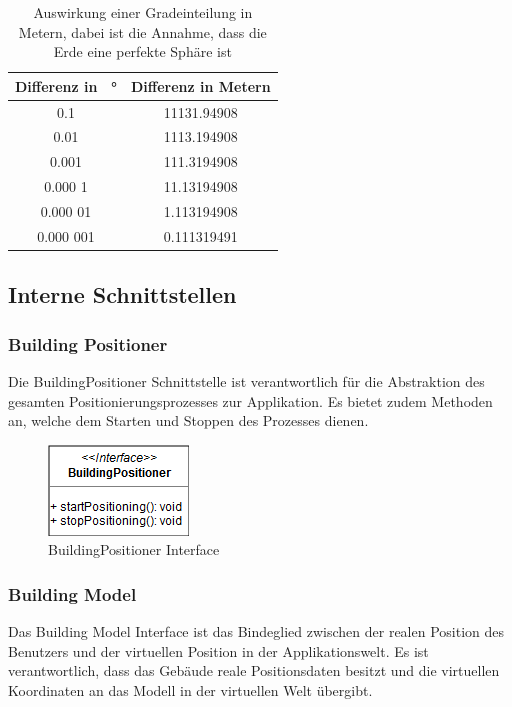 \documentclass[a4paper]{scrreprt}
\begin{document}
\begin{table}[htb]
	\centering
	\begin{tabular}{|c|c|}
		\hline
		\textbf{Differenz in \SI{}{\degree}} & \textbf{Differenz in Metern}\\
		\hline
		0.1 & 11131.94908 \\
		\hline
		0.01 & 1113.194908 \\
		\hline
		0.001 & 111.3194908 \\
		\hline
		0.000 1 & 11.13194908 \\
		\hline
		0.000 01 & 1.113194908 \\
		\hline
		0.000 001 & 0.111319491 \\
		\hline
	\end{tabular} 
	\caption{Auswirkung einer Gradeinteilung in Metern, dabei ist die Annahme, dass die Erde eine perfekte Sphäre ist}
	\label{tab:GradMeter}
\end{table}

\subsection{Interne Schnittstellen}

\subsubsection{Building Positioner}
Die BuildingPositioner Schnittstelle ist verantwortlich für die Abstraktion des gesamten Positionierungsprozesses zur Applikation. Es bietet zudem Methoden an, welche dem Starten und Stoppen des Prozesses dienen.
\begin{figure}[h!]
	\center
	\includegraphics[scale=0.6]{BuildingPositioner.png}
	\caption{BuildingPositioner Interface}
\end{figure}
\clearpage
\subsubsection{Building Model}
Das Building Model Interface ist das Bindeglied zwischen der realen Position des Benutzers und der virtuellen Position in der Applikationswelt. Es ist verantwortlich, dass das Gebäude reale Positionsdaten besitzt und die virtuellen Koordinaten an das Modell in der virtuellen Welt übergibt.
\end{document}
